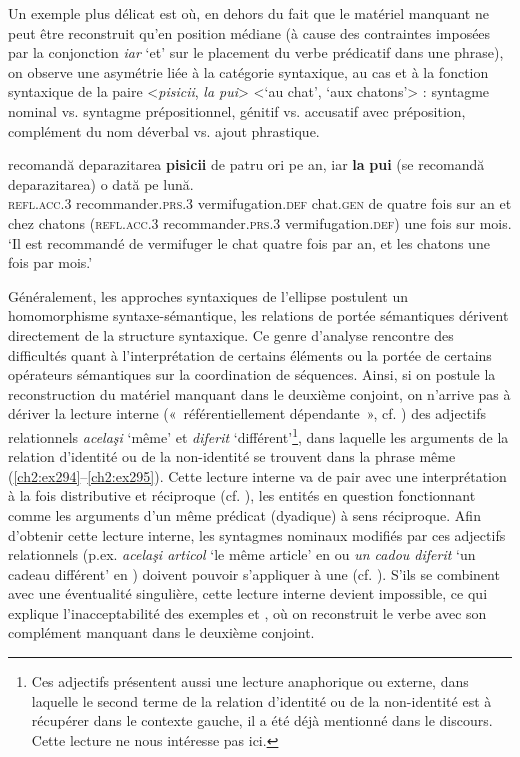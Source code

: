 Un exemple plus délicat est  où, en dehors du fait que le matériel manquant ne peut être reconstruit qu’en position médiane (à cause des contraintes imposées par la conjonction \textit{iar} ‘et’ sur le placement du verbe prédicatif dans une phrase), on observe une asymétrie liée à la catégorie syntaxique, au cas et à la fonction syntaxique de la paire <\textit{pisicii}, \textit{la pui}> <‘au chat’, ‘aux chatons’> : syntagme nominal vs. syntagme prépositionnel, génitif vs. accusatif avec préposition, complément du nom déverbal vs. ajout phrastique.

\ea \label{ch2:ex293}
\gll {}  recomandă deparazitarea \textbf{pisicii} de  patru  ori pe  an,  iar \textbf{la} \textbf{pui} (se  recomandă  deparazitarea)  o  dată pe  lună.\\
\textsc{refl.acc.3} recommander.\textsc{prs.3} vermifugation.\textsc{def} chat.\textsc{gen} de  quatre  fois sur  an  et  chez  chatons (\textsc{refl.acc.3} recommander.\textsc{prs.3} vermifugation.\textsc{def})  une  fois sur  mois.\\ 
\glt ‘Il est recommandé de vermifuger le chat quatre fois par an, et les chatons une fois par mois.’
\z

Généralement, les approches syntaxiques de l’ellipse postulent un homomorphisme syntaxe-sémantique, {\cad} les relations de portée sémantiques dérivent directement de la structure syntaxique. Ce genre d’analyse rencontre des difficultés quant à l’interprétation de certains éléments ou la portée de certains opérateurs sémantiques sur la coordination de séquences. Ainsi, si on postule la reconstruction du matériel manquant dans le deuxième conjoint, on n’arrive pas à dériver la lecture interne («~référentiellement dépendante~», cf. \citealt{LacaEtAl2001}) des adjectifs relationnels \textit{acelaşi} ‘même’ et \textit{diferit} ‘différent’\footnote{
 Ces adjectifs présentent aussi une lecture anaphorique ou externe, dans laquelle le second terme de la relation d’identité ou de la non-identité est à récupérer dans le contexte gauche, {\cad} il a été déjà mentionné dans le discours. Cette lecture ne nous intéresse pas ici.}, dans laquelle les arguments de la relation d’identité ou de la non-identité se trouvent dans la phrase même (\ref{ch2:ex294}--\ref{ch2:ex295}). Cette lecture interne va de pair avec une interprétation à la fois distributive et réciproque (cf. \citealt{VanPeteghem2002}), les entités en question fonctionnant comme les arguments d’un même prédicat (dyadique) à sens réciproque. Afin d’obtenir cette lecture interne, les syntagmes nominaux modifiés par ces adjectifs relationnels (p.ex. \textit{acelaşi articol} ‘le même article’ en  ou \textit{un cadou diferit} ‘un cadeau différent’ en ) doivent pouvoir s’appliquer à une  (cf. \citealt{Carlson1987}). S’ils se combinent avec une éventualité singulière, cette lecture interne devient impossible, ce qui explique l’inacceptabilité des exemples  et , où on reconstruit le verbe avec son complément manquant dans le deuxième conjoint.

